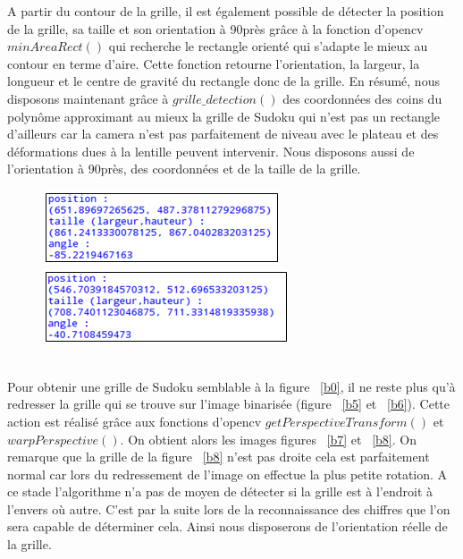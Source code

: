 \documentclass[12pt]{article}
\begin{document}
\noindent
A partir du contour de la grille, il est également possible de détecter la position de la grille, sa taille et son orientation à 90\degre  près grâce à la fonction d'opencv $minAreaRect()$ qui recherche le rectangle orienté qui s'adapte le mieux au contour en terme d'aire. Cette fonction retourne l'orientation, la largeur, la longueur et le centre de gravité du rectangle donc de la grille.
En résumé, nous disposons maintenant grâce à $grille\_detection()$ des coordonnées des coins du polynôme approximant au mieux la grille de Sudoku qui n'est pas un rectangle d'ailleurs car la camera n'est pas parfaitement de niveau avec le plateau et des déformations dues à la lentille peuvent intervenir. Nous disposons aussi de l'orientation à 90\degre   près, des coordonnées et de la taille de la grille.
\begin{figure}[!h]
\centering
\begin{minipage}{.5\textwidth}
  \centering
  \includegraphics[scale = 0.9]{b5.png}
\end{minipage}%
\begin{minipage}{.5\textwidth}
  \centering
  \includegraphics[scale = 0.9]{b6.png}
\end{minipage}
\end{figure}\\
Pour obtenir une grille de Sudoku semblable à la figure ~\ref{b0}, il ne reste plus qu'à redresser la grille qui se trouve sur l'image binarisée (figure ~\ref{b5} et ~\ref{b6}). Cette action est réalisé grâce aux fonctions d'opencv $getPerspectiveTransform()$ et $warpPerspective()$. On obtient alors les images figures ~\ref{b7} et ~\ref{b8}. On remarque que la grille de la figure ~\ref{b8} n'est pas droite cela est parfaitement normal car lors du redressement de l'image on effectue la plus petite rotation. A ce stade l'algorithme n'a pas de moyen de détecter si la grille est à l'endroit à l'envers où autre. C'est par la suite lors de la reconnaissance des chiffres que l'on sera capable de déterminer cela. Ainsi nous disposerons de l'orientation réelle de la grille.
\end{document}
